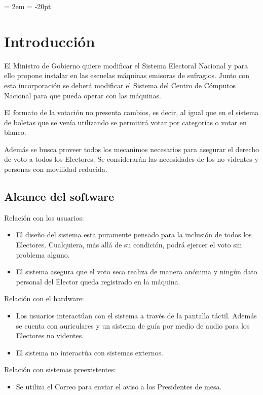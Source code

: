 \documentclass[spanish, 10pt,a4paper]{article}
\numberwithin{equation}{section} %
\begin{document}
{ \oddsidemargin = 2em
	\headheight = -20pt
	\maketitle
}
	\tableofcontents
	\newpage
\section{Introducción}
	El Ministro de Gobierno quiere modificar el Sistema Electoral Nacional y para ello propone instalar en las escuelas máquinas emisoras de sufragios. Junto con esta incorporación se deberá modificar el Sistema del Centro de Cómputos Nacional para que pueda operar con las máquinas.

	El formato de la votación no presenta cambios, es decir, al igual que en el sistema de boletas que se venía utilizando se permitirá votar por categorías o votar en blanco. 
	
	Además se busca proveer todos los mecanimos necesarios para asegurar el derecho de voto a todos los Electores. Se considerarán las necesidades de los no videntes y personas con movilidad reducida. 

\subsection{Alcance del software}

	Relación con los usuarios: 
\begin{itemize}
\item El diseño del sistema esta puramente pensado para la inclusión de todos los Electores. Cualquiera, más allá de su condición, podrá ejercer el voto sin problema alguno.
\item El sistema asegura que el voto seca realiza de manera anónima y ningún dato personal del Elector queda registrado en la máquina.
\end{itemize}

	Relación con el hardware:
\begin{itemize}
\item Los usuarios interactúan con el sistema a través de la pantalla táctil. Además se cuenta con auriculares y un sistema de guía por medio de audio para los Electores no videntes.
\item El sistema no interactúa con sistemas externos.
\end{itemize}

	Relación con sistemas preexistentes:
\begin{itemize}	
\item Se utiliza el Correo para enviar el aviso a los Presidentes de mesa.
\end{itemize}
\end{document}
